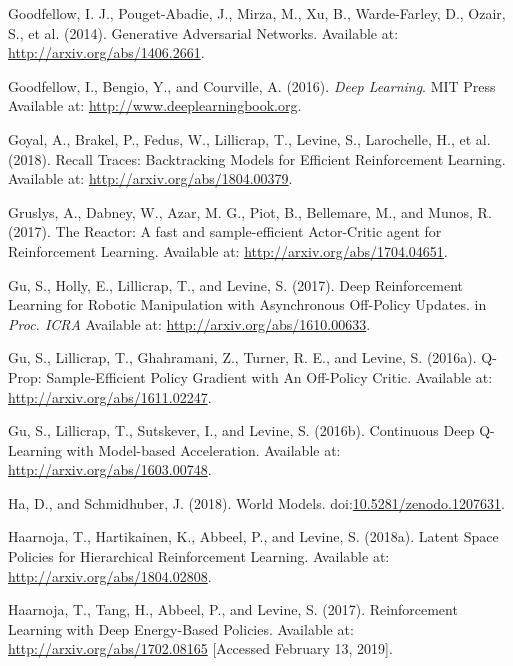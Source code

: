 \documentclass[
  letterpaper,
  DIV=11,
  numbers=noendperiod]{scrreprt}
\newlength{\cslhangindent}
\newlength{\cslentryspacingunit} %
\newenvironment{CSLReferences}[2] %
 {%
  \setlength{\parindent}{0pt}
  \ifodd #1
  \let\oldpar\par
  \def\par{\hangindent=\cslhangindent\oldpar}
  \fi
  \setlength{\parskip}{#2\cslentryspacingunit}
 }%
 {}
\begin{document}
\begin{CSLReferences}{1}{0}
\leavevmode{}%
Goodfellow, I. J., Pouget-Abadie, J., Mirza, M., Xu, B., Warde-Farley,
D., Ozair, S., et al. (2014). Generative {Adversarial Networks}.
Available at: \url{http://arxiv.org/abs/1406.2661}.

\leavevmode{}%
Goodfellow, I., Bengio, Y., and Courville, A. (2016). \emph{Deep
{Learning}}. {MIT Press} Available at:
\url{http://www.deeplearningbook.org}.

\leavevmode{}%
Goyal, A., Brakel, P., Fedus, W., Lillicrap, T., Levine, S., Larochelle,
H., et al. (2018). Recall {Traces}: {Backtracking Models} for {Efficient
Reinforcement Learning}. Available at:
\url{http://arxiv.org/abs/1804.00379}.

\leavevmode{}%
Gruslys, A., Dabney, W., Azar, M. G., Piot, B., Bellemare, M., and
Munos, R. (2017). The {Reactor}: {A} fast and sample-efficient
{Actor-Critic} agent for {Reinforcement Learning}. Available at:
\url{http://arxiv.org/abs/1704.04651}.

\leavevmode{}%
Gu, S., Holly, E., Lillicrap, T., and Levine, S. (2017). Deep
{Reinforcement Learning} for {Robotic Manipulation} with {Asynchronous
Off-Policy Updates}. in \emph{Proc. {ICRA}} Available at:
\url{http://arxiv.org/abs/1610.00633}.

\leavevmode{}%
Gu, S., Lillicrap, T., Ghahramani, Z., Turner, R. E., and Levine, S.
(2016a). Q-{Prop}: {Sample-Efficient Policy Gradient} with {An
Off-Policy Critic}. Available at: \url{http://arxiv.org/abs/1611.02247}.

\leavevmode{}%
Gu, S., Lillicrap, T., Sutskever, I., and Levine, S. (2016b). Continuous
{Deep Q-Learning} with {Model-based Acceleration}. Available at:
\url{http://arxiv.org/abs/1603.00748}.

\leavevmode{}%
Ha, D., and Schmidhuber, J. (2018). World {Models}.
doi:\href{https://doi.org/10.5281/zenodo.1207631}{10.5281/zenodo.1207631}.

\leavevmode{}%
Haarnoja, T., Hartikainen, K., Abbeel, P., and Levine, S. (2018a).
Latent {Space Policies} for {Hierarchical Reinforcement Learning}.
Available at: \url{http://arxiv.org/abs/1804.02808}.

\leavevmode{}%
Haarnoja, T., Tang, H., Abbeel, P., and Levine, S. (2017). Reinforcement
{Learning} with {Deep Energy-Based Policies}. Available at:
\url{http://arxiv.org/abs/1702.08165} {[}Accessed February 13, 2019{]}.


\end{CSLReferences}
\end{document}
